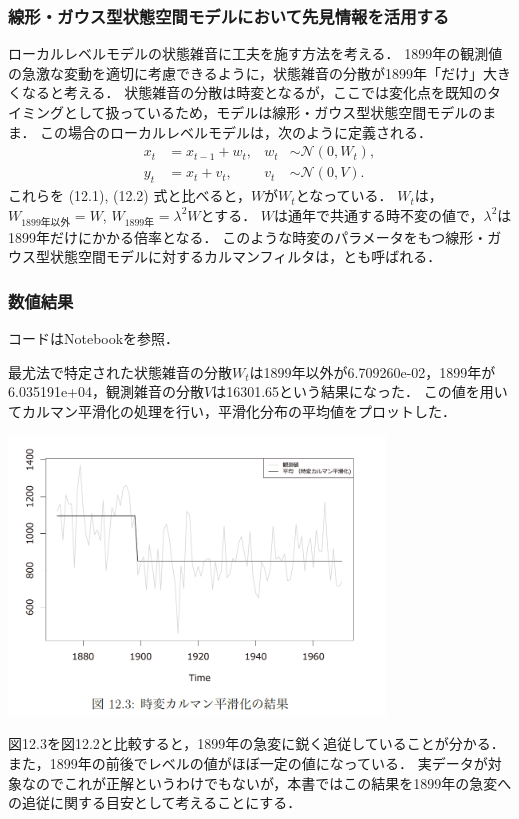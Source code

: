 \documentclass[11pt,a4paper]{jsarticle}
\numberwithin{equation}{section}
\begin{document}
\subsubsection{線形・ガウス型状態空間モデルにおいて先見情報を活用する}
ローカルレベルモデルの状態雑音に工夫を施す方法を考える．
1899年の観測値の急激な変動を適切に考慮できるように，状態雑音の分散が1899年「だけ」大きくなると考える．
状態雑音の分散は時変となるが，ここでは変化点を既知のタイミングとして扱っているため，モデルは線形・ガウス型状態空間モデルのまま．
この場合のローカルレベルモデルは，次のように定義される．
\begin{align}
x_t
& =
x_{t-1} + w_t, & w_t & \sim \mathcal{N} (0, W_t), \\
y_t
& =
x_t + v_t, & v_t & \sim \mathcal{N} (0, V).
\end{align}
これらを (12.1), (12.2) 式と比べると，$W$が$W_t$となっている．
$W_t$は，$W_{1899年以外} = W$, $W_{1899年} = λ^2 W$とする．
$W$は通年で共通する時不変の値で，$λ^2$は1899年だけにかかる倍率となる．
このような時変のパラメータをもつ線形・ガウス型状態空間モデルに対するカルマンフィルタは，とも呼ばれる．

\subsubsection{数値結果}
コードはNotebookを参照．

最尤法で特定された状態雑音の分散$W_t$は1899年以外が6.709260e-02，1899年が6.035191e+04，観測雑音の分散$V$は16301.65という結果になった．
この値を用いてカルマン平滑化の処理を行い，平滑化分布の平均値をプロットした．
\begin{center}
\includegraphics[width=10cm]{img/Figure12_3.png}
\end{center}

図12.3を図12.2と比較すると，1899年の急変に鋭く追従していることが分かる．
また，1899年の前後でレベルの値がほぼ一定の値になっている．
実データが対象なのでこれが正解というわけでもないが，本書ではこの結果を1899年の急変への追従に関する目安として考えることにする．
\end{document}
